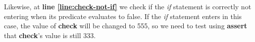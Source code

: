 \documentclass[11pt,fleqn,openany]{book} %
\begin{document}
Likewise, at \textbf{line \ref{line:check-not-if}} we check if the \emph{if} statement is correctly not entering when its predicate evaluates to false. If the \emph{if} statement enters in this case, the value of \textbf{check} will be changed to 555, so we need to test using \textbf{assert} that \textbf{check}'s value is still 333.

\newpage

\printindex

\newpage

\printbibliography[heading=subbibliography,notkeyword=this]
\end{document}

